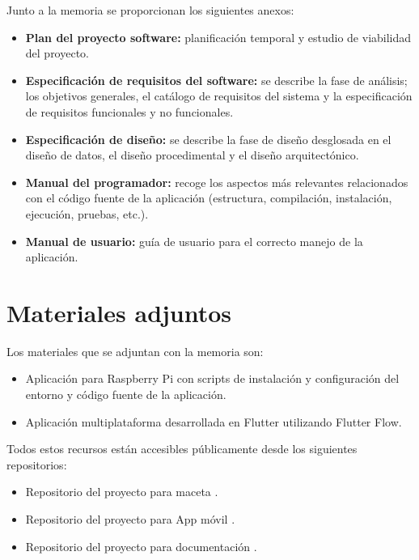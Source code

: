 Junto a la memoria se proporcionan los siguientes anexos:

\begin{itemize}
    \item \textbf{Plan del proyecto software:} planificación temporal y estudio de viabilidad del proyecto.
    \item \textbf{Especificación de requisitos del software:} se describe la fase de análisis; los objetivos generales, el catálogo de requisitos del sistema y la especificación de requisitos funcionales y no funcionales.
    \item \textbf{Especificación de diseño:} se describe la fase de diseño desglosada en el diseño de datos, el diseño procedimental y el diseño arquitectónico.
    \item \textbf{Manual del programador:} recoge los aspectos más relevantes relacionados con el código fuente de la aplicación (estructura, compilación, instalación, ejecución, pruebas, etc.).
    \item \textbf{Manual de usuario:} guía de usuario para el correcto manejo de la aplicación.
\end{itemize}

\section{Materiales adjuntos}\label{materiales-adjuntos}

Los materiales que se adjuntan con la memoria son: 
\begin{itemize}
    \item Aplicación para Raspberry Pi con scripts de instalación y configuración del entorno y código fuente de la aplicación.
    \item Aplicación multiplataforma desarrollada en Flutter utilizando Flutter Flow.
\end{itemize}

Todos estos recursos están accesibles públicamente desde los siguientes repositorios:
\begin{itemize}
    \item Repositorio del proyecto para maceta \cite{GreenInHouse:repo:Maceta}.
    \item Repositorio del proyecto para App móvil \cite{GreenInHouse:repo:AppMovil}.
    \item Repositorio del proyecto para documentación \cite{GreenInHouse:repo:Documentación}.
\end{itemize}
